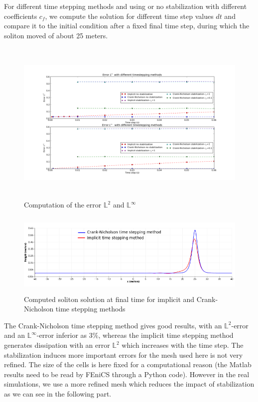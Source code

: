 \documentclass[11pt,a4paper]{article}
\begin{document}
	For different time stepping methods and using or no stabilization with different coefficients $c_f$, we compute the solution for different time step values $dt$ and compare it to the initial condition after a fixed final time step, during which the soliton moved of about 25 meters. 
	\begin{figure}[!h]
		\centering
		\includegraphics[height=8cm]{ErrorL2L801.png}
		\caption{Computation of the error $\mathbb{L}^2$ and $\mathbb{L}^{\infty}$}
	\end{figure}
	
	\begin{figure}[!h]
		\centering
		\includegraphics[height=4cm]{SolitonSolution.png}
		\caption{Computed soliton solution at final time for implicit and Crank-Nicholson time stepping methods}
	\end{figure}
	
	The Crank-Nicholson time stepping method gives good results, with an $\mathbb{L}^2$-error and an $\mathbb{L}^{\infty}$-error inferior as $3\%$, whereas the implicit time stepping method generates dissipation with an error $\mathbb{L}^2$ which increases with the time step. The stabilization induces more important errors for the mesh used here is not very refined. The size of the cells is here fixed for a computational reason (the Matlab results need to be read by FEniCS through a Python code). However in the real simulations, we use a more refined mesh which reduces the impact of stabilization as we can see in the following part. 
				
\end{document}
